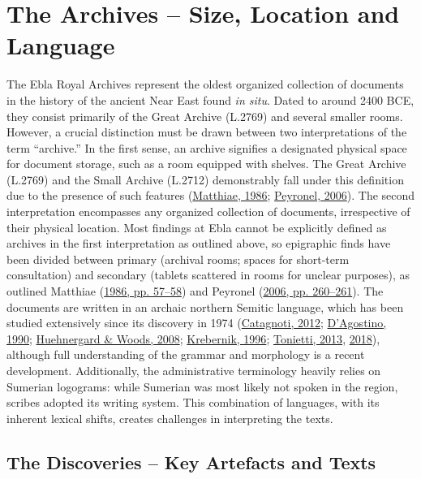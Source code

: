 \documentclass[
]{book}
\begin{document}
\hypertarget{the-archives-size-location-and-language}{%
\section{The Archives -- Size, Location and Language}\label{the-archives-size-location-and-language}}

The Ebla Royal Archives represent the oldest organized collection of documents in the history of the ancient Near East found \emph{in situ}. Dated to around 2400 BCE, they consist primarily of the Great Archive (L.2769) and several smaller rooms. However, a crucial distinction must be drawn between two interpretations of the term ``archive.'' In the first sense, an archive signifies a designated physical space for document storage, such as a room equipped with shelves. The Great Archive (L.2769) and the Small Archive (L.2712) demonstrably fall under this definition due to the presence of such features (\protect\hyperlink{ref-Matthiae1986c}{Matthiae, 1986}; \protect\hyperlink{ref-Peyronel2006}{Peyronel, 2006}). The second interpretation encompasses any organized collection of documents, irrespective of their physical location. Most findings at Ebla cannot be explicitly defined as archives in the first interpretation as outlined above, so epigraphic finds have been divided between primary (archival rooms; spaces for short-term consultation) and secondary (tablets scattered in rooms for unclear purposes), as outlined Matthiae (\protect\hyperlink{ref-Matthiae1986c}{1986, pp. 57--58}) and Peyronel (\protect\hyperlink{ref-Peyronel2006}{2006, pp. 260--261}).
The documents are written in an archaic northern Semitic language, which has been studied extensively since its discovery in 1974 (\protect\hyperlink{ref-Catagnoti2012a}{Catagnoti, 2012}; \protect\hyperlink{ref-DAgostino1990a}{D'Agostino, 1990}; \protect\hyperlink{ref-HuehnergardWoods2008}{Huehnergard \& Woods, 2008}; \protect\hyperlink{ref-Krebernik1996b}{Krebernik, 1996}; \protect\hyperlink{ref-Tonietti2013a}{Tonietti, 2013}, \protect\hyperlink{ref-Tonietti2018b}{2018}), although full understanding of the grammar and morphology is a recent development. Additionally, the administrative terminology heavily relies on Sumerian logograms: while Sumerian was most likely not spoken in the region, scribes adopted its writing system. This combination of languages, with its inherent lexical shifts, creates challenges in interpreting the texts.

\hypertarget{the-discoveries-key-artefacts-and-texts}{%
\subsection{The Discoveries -- Key Artefacts and Texts}\label{the-discoveries-key-artefacts-and-texts}}
\end{document}
